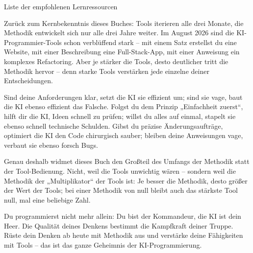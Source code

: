 \begin{center}\small\color{gray}Liste der empfohlenen Lernressourcen\end{center}


Zurück zum Kernbekenntnis dieses Buches: Tools iterieren alle drei Monate, die Methodik entwickelt sich nur alle drei Jahre weiter. Im August 2026 sind die KI-Programmier-Tools schon verblüffend stark – mit einem Satz erstellst du eine Website, mit einer Beschreibung eine Full-Stack-App, mit einer Anweisung ein komplexes Refactoring. Aber je stärker die Tools, desto deutlicher tritt die Methodik hervor – denn starke Tools verstärken jede einzelne deiner Entscheidungen.

Sind deine Anforderungen klar, setzt die KI sie effizient um; sind sie vage, baut die KI ebenso effizient das Falsche. Folgst du dem Prinzip „Einfachheit zuerst“, hilft dir die KI, Ideen schnell zu prüfen; willst du alles auf einmal, stapelt sie ebenso schnell technische Schulden. Gibst du präzise Änderungsaufträge, optimiert die KI den Code chirurgisch sauber; bleiben deine Anweisungen vage, verbaut sie ebenso forsch Bugs.

Genau deshalb widmet dieses Buch den Großteil des Umfangs der Methodik statt der Tool-Bedienung. Nicht, weil die Tools unwichtig wären – sondern weil die Methodik der „Multiplikator“ der Tools ist: Je besser die Methodik, desto größer der Wert der Tools; bei einer Methodik von null bleibt auch das stärkste Tool null, mal eine beliebige Zahl.

Du programmierst nicht mehr allein: Du bist der Kommandeur, die KI ist dein Heer. Die Qualität deines Denkens bestimmt die Kampfkraft deiner Truppe. Rüste dein Denken ab heute mit Methodik aus und verstärke deine Fähigkeiten mit Tools – das ist das ganze Geheimnis der KI-Programmierung.


